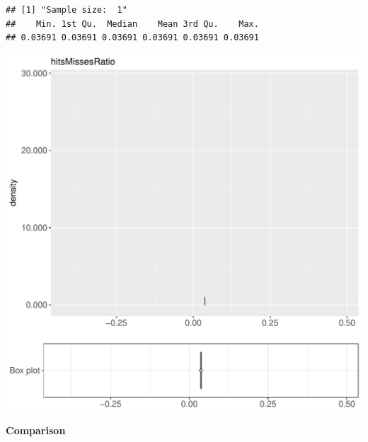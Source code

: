 \documentclass{article}\usepackage[]{graphicx}\usepackage[]{color}
\makeatletter
\def\maxwidth{ %
  \ifdim\Gin@nat@width>\linewidth
    \linewidth
  \else
    \Gin@nat@width
  \fi
}
\newenvironment{kframe}{%
 \def\at@end@of@kframe{}%
 \ifinner\ifhmode%
  \def\at@end@of@kframe{\end{minipage}}%
  \begin{minipage}{\columnwidth}%
 \fi\fi%
 \def\FrameCommand##1{\hskip\@totalleftmargin \hskip-\fboxsep
 \colorbox{shadecolor}{##1}\hskip-\fboxsep
     \hskip-\linewidth \hskip-\@totalleftmargin \hskip\columnwidth}%
 \MakeFramed {\advance\hsize-\width
   \@totalleftmargin\z@ \linewidth\hsize
   \@setminipage}}%
 {\par\unskip\endMakeFramed%
 \at@end@of@kframe}
\newenvironment{knitrout}{}{} %
\makeatother
\begin{document}
\begin{knitrout}
\color{fgcolor}\begin{kframe}
\begin{verbatim}
## [1] "Sample size:  1"
##    Min. 1st Qu.  Median    Mean 3rd Qu.    Max. 
## 0.03691 0.03691 0.03691 0.03691 0.03691 0.03691
\end{verbatim}


{\ttfamily\noindent\bfseries{}}\end{kframe}
\includegraphics[width=\maxwidth]{figure/RH5_trivialcaching_password2-1} 

\end{knitrout}
  
 \textbf{Comparison}
  
\end{document}
